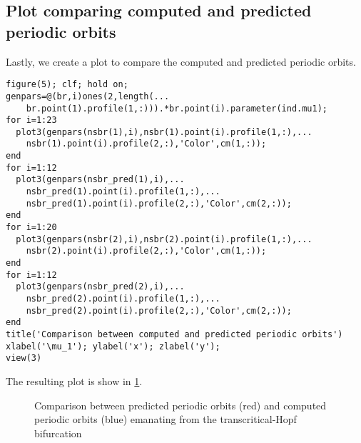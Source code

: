 \subsection{Plot comparing computed and predicted periodic orbits} \label{switch:sm:sec:vdpo:comparing_period_orbits}
Lastly, we create a plot to compare the computed and predicted periodic orbits.
\begin{lstlisting}[style=customMatlab]
%% Plot comparing computed and predicted periodic orbits
figure(5); clf; hold on;
genpars=@(br,i)ones(2,length(...
    br.point(1).profile(1,:))).*br.point(i).parameter(ind.mu1);
for i=1:23
  plot3(genpars(nsbr(1),i),nsbr(1).point(i).profile(1,:),...
    nsbr(1).point(i).profile(2,:),'Color',cm(1,:));
end
for i=1:12
  plot3(genpars(nsbr_pred(1),i),...
    nsbr_pred(1).point(i).profile(1,:),...
    nsbr_pred(1).point(i).profile(2,:),'Color',cm(2,:));
end
for i=1:20
  plot3(genpars(nsbr(2),i),nsbr(2).point(i).profile(1,:),...
    nsbr(2).point(i).profile(2,:),'Color',cm(1,:));
end
for i=1:12
  plot3(genpars(nsbr_pred(2),i),...
    nsbr_pred(2).point(i).profile(1,:),...
    nsbr_pred(2).point(i).profile(2,:),'Color',cm(2,:));
end
title('Comparison between computed and predicted periodic orbits')
xlabel('\mu_1'); ylabel('x'); zlabel('y');
view(3)
\end{lstlisting}
The resulting plot is show in \cref{switch:sm:VDPO_compare_periodic_orbits}.

\begin{figure}
    \centering
	\caption{Comparison between predicted periodic orbits (red) and computed periodic orbits (blue) emanating from the transcritical-Hopf bifurcation}
	\label{switch:sm:VDPO_compare_periodic_orbits}
\end{figure}

